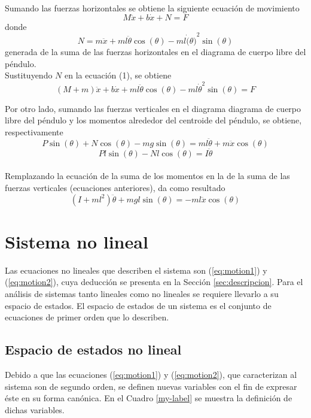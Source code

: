 \documentclass[journal]{IEEEtran}
\begin{document}
Sumando las fuerzas horizontales se obtiene la siguiente ecuación de movimiento
\begin{equation}
\label{eq:motion}
M\ddot{x}+b\dot{x}+N = F
\end{equation}
donde
\[N = m\ddot{x} + ml\ddot{\theta}\cos(\theta) - ml{\dot(\theta)}^2\sin(\theta)\]
generada de la suma de las fuerzas horizontales en el diagrama de cuerpo libre del péndulo.
\\

Sustituyendo $N$ en la ecuación (1), se obtiene
\begin{equation}
  \label{eq:motion1}
  (M + m)\ddot{x} + b\dot{x} + ml\ddot{\theta}\cos(\theta)
     - ml\dot{\theta}^2\sin(\theta) = F
\end{equation}
\textbf{}

Por otro lado, sumando las fuerzas verticales en el diagrama diagrama de cuerpo libre del péndulo y los momentos alrededor del centroide del péndulo, se obtiene, respectivamente
\[P\sin(\theta) + N\cos(\theta) - mg\sin(\theta)
   = ml\ddot{\theta} + m\ddot{x}\cos(\theta)\]
\[Pl\sin(\theta) - Nl\cos(\theta) = I\ddot{\theta}\]
\\
Remplazando la ecuación de la suma de los momentos en la de la suma de las fuerzas verticales (ecuaciones anteriores), da como resultado
\begin{equation}
\label{eq:motion2}
(I + ml^2)\ddot{\theta} + mgl\sin(\theta) = -ml\ddot{x}\cos(\theta)
\end{equation}
\textbf{}

\section{Sistema no lineal}
Las ecuaciones no lineales que describen el sistema son (\ref{eq:motion1}) y (\ref{eq:motion2}), cuya deducción se presenta en la Sección \ref{sec:descripcion}. Para el análisis de sistemas tanto lineales como no lineales se requiere llevarlo a su espacio de estados. El espacio de estados de un sistema es el conjunto de ecuaciones de primer orden que lo describen.

\subsection{Espacio de estados no lineal}\label{subsub:var}
Debido a que las ecuaciones (\ref{eq:motion1}) y (\ref{eq:motion2}), que caracterizan al sistema son de segundo orden, se definen nuevas variables con el fin de expresar éste en su forma canónica. En el Cuadro \ref{my-label} se muestra la definición de dichas variables. 
\end{document}
